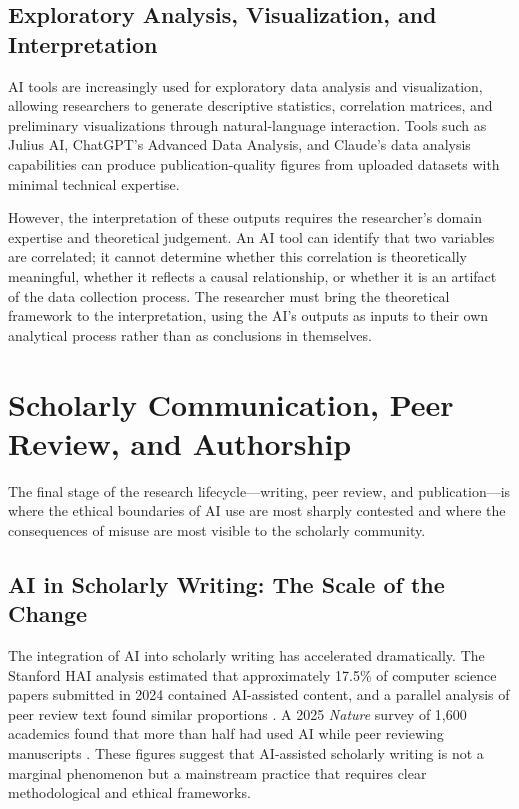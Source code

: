 \documentclass[12pt, a4paper]{article}
\begin{document}
\subsection{Exploratory Analysis, Visualization, and Interpretation}

AI tools are increasingly used for exploratory data analysis and visualization, allowing researchers to generate descriptive statistics, correlation matrices, and preliminary visualizations through natural-language interaction. Tools such as Julius AI, ChatGPT's Advanced Data Analysis, and Claude's data analysis capabilities can produce publication-quality figures from uploaded datasets with minimal technical expertise.

However, the interpretation of these outputs requires the researcher's domain expertise and theoretical judgement. An AI tool can identify that two variables are correlated; it cannot determine whether this correlation is theoretically meaningful, whether it reflects a causal relationship, or whether it is an artifact of the data collection process. The researcher must bring the theoretical framework to the interpretation, using the AI's outputs as inputs to their own analytical process rather than as conclusions in themselves.

\section{Scholarly Communication, Peer Review, and Authorship}

The final stage of the research lifecycle---writing, peer review, and publication---is where the ethical boundaries of AI use are most sharply contested and where the consequences of misuse are most visible to the scholarly community.

\subsection{AI in Scholarly Writing: The Scale of the Change}

The integration of AI into scholarly writing has accelerated dramatically. The Stanford HAI analysis estimated that approximately 17.5\% of computer science papers submitted in 2024 contained AI-assisted content, and a parallel analysis of peer review text found similar proportions \citep{hai2024llmresearch}. A 2025 \textit{Nature} survey of 1,600 academics found that more than half had used AI while peer reviewing manuscripts \citep{nature2025peerreview}. These figures suggest that AI-assisted scholarly writing is not a marginal phenomenon but a mainstream practice that requires clear methodological and ethical frameworks.
\end{document}
